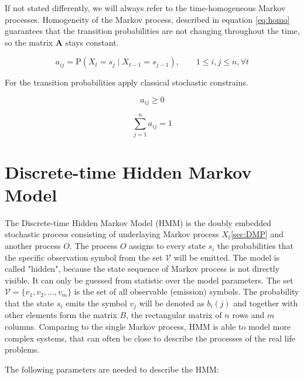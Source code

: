 \documentclass[thesis=M,english]{FITthesis}[2012/10/20]
\newcommand{\matr}[1]{\mathbf{#1}}
\begin{document}
If not stated differently, we will always refer to the time-homogeneous Markov processes. Homogeneity of the Markov process, described in equation \eqref{eq:homo} guarantees that the transition probabilities are not changing throughout the time, so the matrix $\matr{A}$ stays constant. 

\begin{equation}\label{eq:homo}
   a_{ij} = \mathrm{P}(X_t = s_j \mid X_{t-1} = s_{j-1} ),\qquad 1 \leq i,j \leq n, \forall t
\end{equation}

For the transition probabilities apply classical stochastic constrains.

\begin{equation}
   a_{ij} \geq 0
\end{equation}

\begin{equation}
   \sum_{j=1}^n a_{ij} = 1
\end{equation}

\section{Discrete-time Hidden Markov Model}

The Discrete-time Hidden Markov Model (HMM) is the doubly embedded stochastic process consisting of underlaying Markov process $X_t$\ref{sec:DMP} and another process $O$. The process $O$ assigns to every state $s_i$ the probabilities that the specific observation symbol from the set $\mathcal{V}$ will be emitted. The model is called "hidden", because the state sequence of Markov process is not directly visible. It can only be guessed from statistic over the model parameters. The set $\mathcal{V}=\{  v_1,v_2,\dots,v_m\}$ is the set of all observable (emission) symbols. The probability that the state $s_i$ emits the symbol $v_j$ will be denoted as $b_i(j)$ and together with other elements form the matrix $B$, the rectangular matrix of $n$ rows and $m$ columns. Comparing to the single Markov process, HMM is able to model more complex systems, that can often be close to describe the processes of the real life problems.  
  
The following parameters are needed to describe the HMM:
\end{document}
